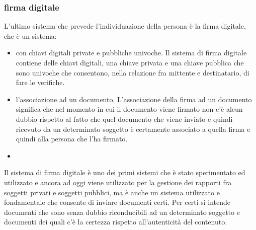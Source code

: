  \subsubsection{firma digitale}
 L'ultimo sistema che prevede l'individuazione della persona è la firma digitale, che è un sistema:
 \begin{itemize}
     \item con chiavi digitali private e pubbliche univoche. Il sistema di firma digitale contiene delle chiavi digitali, una chiave privata e una chiave pubblica che sono univoche che consentono, nella relazione fra mittente e destinatario, di fare le verifiche. 
     \item l'associazione ad un documento. L'associazione della firma ad un documento significa che nel momento in cui il documento viene firmato non c'è alcun dubbio rispetto al fatto che quel documento che viene inviato e quindi ricevuto da un determinato soggetto è certamente associato a quella firma e quindi alla persona che l'ha firmato. 
     \item 
 \end{itemize}
 
 Il sistema di firma digitale è uno dei primi sistemi che è stato sperimentato ed utilizzato e ancora ad oggi viene utilizzato per la gestione dei rapporti fra soggetti privati e soggetti pubblici, ma è anche un sistema utilizzato e fondamentale che consente di inviare documenti certi. Per certi si intende documenti che sono senza dubbio riconducibili ad un determinato soggetto e documenti dei quali c'è la certezza rispetto all'autenticità del contenuto.\par
 
